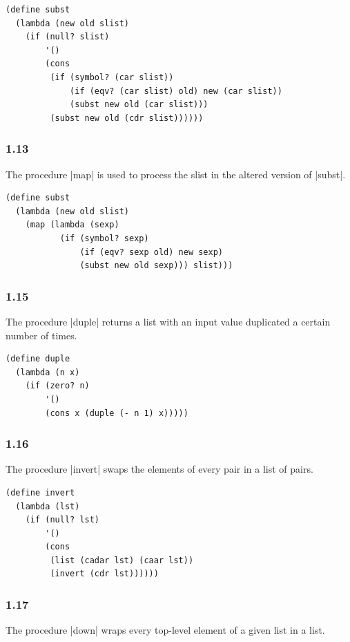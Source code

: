 \documentclass[a4paper]{article}
\begin{document}
\begin{lstlisting}
(define subst
  (lambda (new old slist)
    (if (null? slist)
        '()
        (cons
         (if (symbol? (car slist))
             (if (eqv? (car slist) old) new (car slist))
             (subst new old (car slist)))
         (subst new old (cdr slist))))))
\end{lstlisting}

\subsubsection*{1.13}

The procedure |map| is used to process the slist in the altered version of |subst|.

\begin{lstlisting}
(define subst
  (lambda (new old slist)
    (map (lambda (sexp)
           (if (symbol? sexp)
               (if (eqv? sexp old) new sexp)
               (subst new old sexp))) slist)))
\end{lstlisting}

\subsubsection*{1.15}

The procedure |duple| returns a list with an input value duplicated a certain number of times.

\begin{lstlisting}
(define duple
  (lambda (n x)
    (if (zero? n)
        '()
        (cons x (duple (- n 1) x)))))
\end{lstlisting}

\subsubsection*{1.16}

The procedure |invert| swaps the elements of every pair in a list of pairs.

\begin{lstlisting}
(define invert
  (lambda (lst)
    (if (null? lst)
        '()
        (cons
         (list (cadar lst) (caar lst))
         (invert (cdr lst))))))
\end{lstlisting}

\subsubsection*{1.17}

The procedure |down| wraps every top-level element of a given list in a list.
\end{document}

